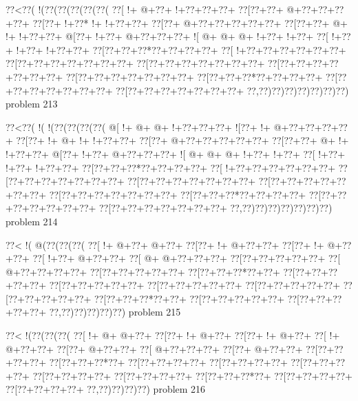 \vbox{\vbox{\goo
\0??<\0??(\- !(\0??(\0??(\0??(\0??(\0??(
\0??[\- !+\- @+\0??+\- !+\0??+\0??+\0??+
\0??[\0??+\0??+\- @+\0??+\0??+\0??+\0??+
\0??[\0??+\- !+\0??*\- !+\- !+\0??+\0??+
\0??[\0??+\- @+\0??+\0??+\0??+\0??+\0??+
\0??[\0??+\0??+\- @+\- !+\- !+\0??+\0??+
\- @[\0??+\- !+\0??+\- @+\0??+\0??+\0??+
\- ![\- @+\- @+\- @+\- !+\0??+\- !+\0??+
\0??[\- !+\0??+\- !+\0??+\- !+\0??+\0??+
\0??[\0??+\0??+\0??*\0??+\0??+\0??+\0??+
\0??[\- !+\0??+\0??+\0??+\0??+\0??+\0??+
\0??[\0??+\0??+\0??+\0??+\0??+\0??+\0??+
\0??[\0??+\0??+\0??+\0??+\0??+\0??+\0??+
\0??[\0??+\0??+\0??+\0??+\0??+\0??+\0??+
\0??[\0??+\0??+\0??+\0??+\0??+\0??+\0??+
\0??[\0??+\0??+\0??*\0??+\0??+\0??+\0??+
\0??[\0??+\0??+\0??+\0??+\0??+\0??+\0??+
\0??[\0??+\0??+\0??+\0??+\0??+\0??+\0??+
\0??,\0??)\0??)\0??)\0??)\0??)\0??)\0??)
}
\hfil problem 213\hfil\break
}

\vbox{\vbox{\goo
\0??<\0??(\- !(\- !(\0??(\0??(\0??(\0??(
\- @[\- !+\- @+\- @+\- !+\0??+\0??+\0??+
\- ![\0??+\- !+\- @+\0??+\0??+\0??+\0??+
\0??[\0??+\- !+\- @+\- !+\- !+\0??+\0??+
\0??[\0??+\- @+\0??+\0??+\0??+\0??+\0??+
\0??[\0??+\0??+\- @+\- !+\- !+\0??+\0??+
\- @[\0??+\- !+\0??+\- @+\0??+\0??+\0??+
\- ![\- @+\- @+\- @+\- !+\0??+\- !+\0??+
\0??[\- !+\0??+\- !+\0??+\- !+\0??+\0??+
\0??[\0??+\0??+\0??*\0??+\0??+\0??+\0??+
\0??[\- !+\0??+\0??+\0??+\0??+\0??+\0??+
\0??[\0??+\0??+\0??+\0??+\0??+\0??+\0??+
\0??[\0??+\0??+\0??+\0??+\0??+\0??+\0??+
\0??[\0??+\0??+\0??+\0??+\0??+\0??+\0??+
\0??[\0??+\0??+\0??+\0??+\0??+\0??+\0??+
\0??[\0??+\0??+\0??*\0??+\0??+\0??+\0??+
\0??[\0??+\0??+\0??+\0??+\0??+\0??+\0??+
\0??[\0??+\0??+\0??+\0??+\0??+\0??+\0??+
\0??,\0??)\0??)\0??)\0??)\0??)\0??)\0??)
}
\hfil problem 214\hfil\break
}

\vbox{\vbox{\goo
\0??<\- !(\- @(\0??(\0??(\0??(
\0??[\- !+\- @+\0??+\- @+\0??+
\0??[\0??+\- !+\- @+\0??+\0??+
\0??[\0??+\- !+\- @+\0??+\0??+
\0??[\- !+\0??+\- @+\0??+\0??+
\0??[\- @+\- @+\0??+\0??+\0??+
\0??[\0??+\0??+\0??+\0??+\0??+
\0??[\- @+\0??+\0??+\0??+\0??+
\0??[\0??+\0??+\0??+\0??+\0??+
\0??[\0??+\0??+\0??*\0??+\0??+
\0??[\0??+\0??+\0??+\0??+\0??+
\0??[\0??+\0??+\0??+\0??+\0??+
\0??[\0??+\0??+\0??+\0??+\0??+
\0??[\0??+\0??+\0??+\0??+\0??+
\0??[\0??+\0??+\0??+\0??+\0??+
\0??[\0??+\0??+\0??*\0??+\0??+
\0??[\0??+\0??+\0??+\0??+\0??+
\0??[\0??+\0??+\0??+\0??+\0??+
\0??,\0??)\0??)\0??)\0??)\0??)
}
\hfil problem 215\hfil\break
}

\vbox{\vbox{\goo
\0??<\- !(\0??(\0??(\0??(
\0??[\- !+\- @+\- @+\0??+
\0??[\0??+\- !+\- @+\0??+
\0??[\0??+\- !+\- @+\0??+
\0??[\- !+\- @+\0??+\0??+
\0??[\0??+\- @+\0??+\0??+
\0??[\- @+\0??+\0??+\0??+
\0??[\0??+\- @+\0??+\0??+
\0??[\0??+\0??+\0??+\0??+
\0??[\0??+\0??+\0??*\0??+
\0??[\0??+\0??+\0??+\0??+
\0??[\0??+\0??+\0??+\0??+
\0??[\0??+\0??+\0??+\0??+
\0??[\0??+\0??+\0??+\0??+
\0??[\0??+\0??+\0??+\0??+
\0??[\0??+\0??+\0??*\0??+
\0??[\0??+\0??+\0??+\0??+
\0??[\0??+\0??+\0??+\0??+
\0??,\0??)\0??)\0??)\0??)
}
\hfil problem 216\hfil\break
}

